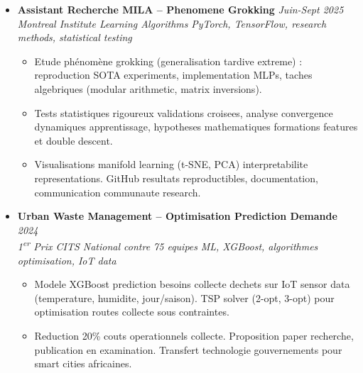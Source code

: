 \documentclass[a4paper,11pt]{article}
\begin{document}
\begin{itemize}[leftmargin=*, label={-}]
\item \textbf{Assistant Recherche MILA -- Phenomene Grokking} \hfill \textit{Juin-Sept 2025} \\
\textit{Montreal Institute Learning Algorithms} \hfill \textit{PyTorch, TensorFlow, research methods, statistical testing}
\vspace{-2pt}
    \begin{itemize}[leftmargin=0.4cm, nosep, label=\tiny$\bullet$]
        \item \small{Etude phénomène grokking (generalisation tardive extreme) : reproduction SOTA experiments, implementation MLPs, taches algebriques (modular arithmetic, matrix inversions).}
        \item \small{Tests statistiques rigoureux validations croisees, analyse convergence dynamiques apprentissage, hypotheses mathematiques formations features et double descent.}
        \item \small{Visualisations manifold learning (t-SNE, PCA) interpretabilite representations. GitHub resultats reproductibles, documentation, communication communaute research.}
    \end{itemize}
\vspace{3pt}

\item \textbf{Urban Waste Management -- Optimisation Prediction Demande} \hfill \textit{2024} \\
\textit{1\textsuperscript{er} Prix CITS National contre 75 equipes} \hfill \textit{ML, XGBoost, algorithmes optimisation, IoT data}
\vspace{-2pt}
    \begin{itemize}[leftmargin=0.4cm, nosep, label=\tiny$\bullet$]
        \item \small{Modele XGBoost prediction besoins collecte dechets sur IoT sensor data (temperature, humidite, jour/saison). TSP solver (2-opt, 3-opt) pour optimisation routes collecte sous contraintes.}
        \item \small{Reduction 20\% couts operationnels collecte. Proposition paper recherche, publication en examination. Transfert technologie gouvernements pour smart cities africaines.}
    \end{itemize}
\vspace{3pt}


\end{itemize}
\end{document}
